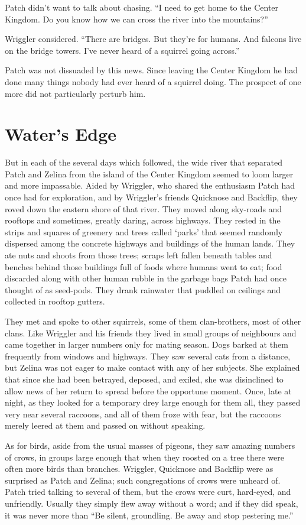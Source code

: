 \documentclass[ebook,oneside,openany,17pt]{memoir}
\renewcommand{\thechapter}{\Roman{chapter}}
\newcounter{sections}
\newcommand{\sections}[1]{%
  \section*{#1}
  \addtocounter{sections}{1}%
  \pdfbookmark[1]{#1}{section.\thechapter.\thesections}}
\begin{document}
Patch didn’t want to talk about chasing. “I need to get home to the
Center Kingdom. Do you know how we can cross the river into the
mountains?”

Wriggler considered. “There are bridges. But they’re for humans. And
falcons live on the bridge towers. I’ve never heard of a squirrel
going across.”

Patch was not dissuaded by this news. Since leaving the Center Kingdom
he had done many things nobody had ever heard of a squirrel doing. The
prospect of one more did not particularly perturb him.


\sections{Water’s Edge}

But in each of the several days which followed, the wide river that
separated Patch and Zelina from the island of the Center Kingdom
seemed to loom larger and more impassable. Aided by Wriggler, who
shared the enthusiasm Patch had once had for exploration, and by
Wriggler’s friends Quicknose and Backflip, they roved down the eastern
shore of that river. They moved along sky-roads and rooftops and
sometimes, greatly daring, across highways. They rested in the strips
and squares of greenery and trees called ‘parks’ that seemed randomly
dispersed among the concrete highways and buildings of the human
lands. They ate nuts and shoots from those trees; scraps left fallen
beneath tables and benches behind those buildings full of foods where
humans went to eat; food discarded along with other human rubble in
the garbage bags Patch had once thought of as seed-pods. They drank
rainwater that puddled on ceilings and collected in rooftop gutters.

They met and spoke to other squirrels, some of them clan-brothers,
most of other clans. Like Wriggler and his friends they lived in small
groups of neighbours and came together in larger numbers only for
mating season. Dogs barked at them frequently from windows and
highways. They saw several cats from a distance, but Zelina was not
eager to make contact with any of her subjects. She explained that
since she had been betrayed, deposed, and exiled, she was disinclined
to allow news of her return to spread before the opportune
moment. Once, late at night, as they looked for a temporary drey large
enough for them all, they passed very near several raccoons, and all
of them froze with fear, but the raccoons merely leered at them and
passed on without speaking.

As for birds, aside from the usual masses of pigeons, they saw amazing
numbers of crows, in groups large enough that when they roosted on a
tree there were often more birds than branches. Wriggler, Quicknose
and Backflip were as surprised as Patch and Zelina; such congregations
of crows were unheard of. Patch tried talking to several of them, but
the crows were curt, hard-eyed, and unfriendly. Usually they simply
flew away without a word; and if they did speak, it was never more
than “Be silent, groundling. Be away and stop pestering me.”
\end{document}

